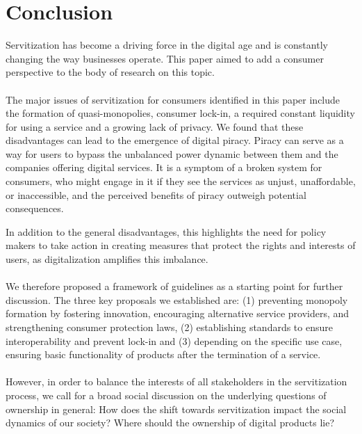 \documentclass[sigplan,screen,nonacm]{acmart}
\begin{document}
\section{Conclusion}
Servitization has become a driving force in the digital age and is constantly changing the way businesses operate. 
This paper aimed to add a consumer perspective to the body of research on this topic. 
\\\\
The major issues of servitization for consumers identified in this paper include the formation of quasi-monopolies, consumer lock-in, a required constant liquidity for using a service and a growing lack of privacy. 
We found that these disadvantages can lead to the emergence of digital piracy. 
Piracy can serve as a way for users to bypass the unbalanced power dynamic between them and the companies offering digital services. It is a symptom of a broken system for consumers, who might engage in it if they see the services as unjust, unaffordable, or inaccessible, and the perceived benefits of piracy outweigh potential consequences. 

In addition to the general disadvantages, this highlights the need for policy makers to take action in creating measures that protect the rights and interests of users, as digitalization amplifies this imbalance.
\\\\
We therefore proposed a framework of guidelines as a starting point for further discussion.
The three key proposals we established are: (1) preventing monopoly formation by fostering innovation, encouraging alternative service providers, and strengthening consumer protection laws, (2) establishing standards to ensure interoperability and prevent lock-in and (3) depending on the specific use case, ensuring basic functionality of products after the termination of a service. 
\\\\
However, in order to balance the interests of all stakeholders in the servitization process, we call for a broad social discussion on the underlying questions of ownership in general: How does the shift towards servitization impact the social dynamics of our society? 
Where should the ownership of digital products lie?
\end{document}
